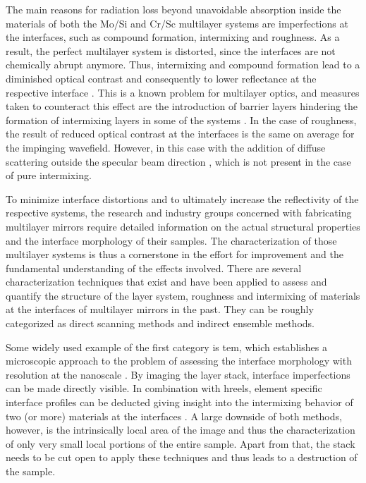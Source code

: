 The main reasons for radiation loss beyond unavoidable absorption inside the materials of both the Mo/Si and Cr/Sc multilayer systems are imperfections at the interfaces, such as compound formation, intermixing and roughness. As a result, the perfect multilayer system is distorted, since the interfaces are not chemically abrupt anymore. Thus, intermixing and compound formation lead to a diminished optical contrast and consequently to lower reflectance at the respective interface \cite{nakajima_interdiffusion_1988}. This is a known problem for multilayer optics, and measures taken to counteract this effect are the introduction of barrier layers hindering the formation of intermixing layers in some of the systems \cite{braun_grenzflachen-optimierte_2003,braun_mo/si_2002}. In the case of roughness, the result of reduced optical contrast at the interfaces is the same on average for the impinging wavefield. However, in this case with the addition of diffuse scattering outside the specular beam direction \cite{sinha_x-ray_1994}, which is not present in the case of pure intermixing.

To minimize interface distortions and to ultimately increase the reflectivity of the respective systems, the research and industry groups concerned with fabricating multilayer mirrors require detailed information on the actual structural properties and the interface morphology of their samples. The characterization of those multilayer systems is thus a cornerstone in the effort for improvement and the fundamental understanding of the effects involved. 
There are several characterization techniques that exist and have been applied to assess and quantify the structure of the layer system, roughness and intermixing of materials at the interfaces of multilayer mirrors in the past. They can be roughly categorized as direct scanning methods and indirect ensemble methods.

Some widely used example of the first category is \gls{tem}, which establishes a microscopic approach to the problem of assessing the interface morphology with resolution at the nanoscale \cite{stearns_thermally_1990, bajt_investigation_2001}. By imaging the layer stack, interface imperfections can be made directly visible. In combination with \gls{hreels}, element specific interface profiles can be deducted giving insight into the intermixing behavior of two (or more) materials at the interfaces \cite{egerton_electron_2011, prasciolu_thermal_2014}. A large downside of both methods, however, is the intrinsically local area of the image and thus the characterization of only very small local portions of the entire sample. Apart from that, the stack needs to be cut open to apply these techniques and thus leads to a destruction of the sample.


